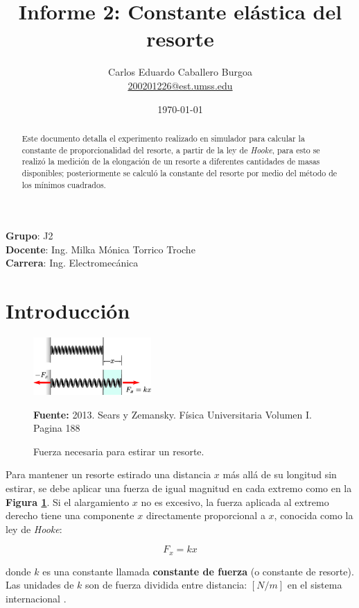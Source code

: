 \documentclass[letter,11pt]{article}
\title{Informe 2: Constante elástica del resorte}
\author{Carlos Eduardo Caballero Burgoa \\
    \small{\href{mailto:200201226@est.umss.edu}{200201226@est.umss.edu}}
}
\date{\today}
\newcommand{\source}[1]{\vspace{-11pt} \caption*{\small{\textbf{Fuente:} {#1}}}}
\begin{document}
\maketitle
\begin{center}
    \textbf{Grupo}: J2\\
    \textbf{Docente}: Ing. Milka Mónica Torrico Troche\\
    \textbf{Carrera}: Ing. Electromecánica
\end{center}

\begin{abstract}
    Este documento detalla el experimento realizado en simulador para calcular 
    la constante de proporcionalidad del resorte, a partir de la ley de
    \emph{Hooke}, para esto se realizó la medición de la elongación de un
    resorte a diferentes cantidades de masas disponibles; posteriormente se
    calculó la constante del resorte por medio del método de los mínimos
    cuadrados.
\end{abstract}

\section{Introducción}

\begin{figure}
\centering
\includegraphics[width=0.40\textwidth]{resources/f1.eps}
\caption{Fuerza necesaria para estirar un resorte.}
\label{figura1}
\source{2013. Sears y Zemansky. Física Universitaria Volumen I. Pagina 188}
\end{figure}

Para mantener un resorte estirado una distancia $x$ más allá de su longitud sin
estirar, se debe aplicar una fuerza de igual magnitud en cada extremo como en la
\textbf{Figura \ref{figura1}}. Si el alargamiento $x$ no es excesivo, la fuerza
aplicada al extremo derecho tiene una componente $x$ directamente proporcional
a $x$, conocida como la ley de \emph{Hooke}:

\begin{equation}
    F_x = k x
\label{hooke}
\end{equation}
\vspace{0.25cm}

donde $k$ es una constante llamada \textbf{constante de fuerza} (o constante de
resorte). Las unidades de $k$ son de fuerza dividida entre distancia: $[N/m]$ en
el sistema internacional \cite{Sears y Zemansky}.
\end{document}

